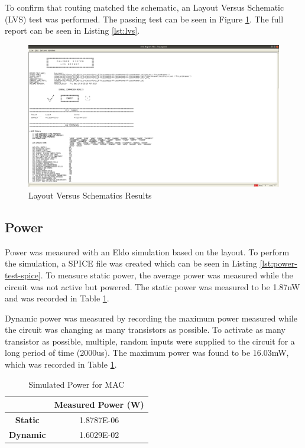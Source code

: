 \documentclass[11pt]{article}
\begin{document}
		To confirm that routing matched the schematic, an Layout Versus Schematic (LVS) test was performed. The passing test can be seen in Figure \ref{fig:LVS-Pass}. The full report can be seen in Listing \ref{lst:lvs}.
		
		\begin{figure}[H] 
			\centering 
			\includegraphics[width=\textwidth,height=\dimexpr\textheight-4\baselineskip-\abovecaptionskip-\belowcaptionskip\relax,keepaspectratio]{"Pictures/LVS Pass"}
			\caption{Layout Versus Schematics Results} 
			\label{fig:LVS-Pass} 
		\end{figure}
	
	\subsection{Power}
		Power was measured with an Eldo simulation based on the layout. To perform the simulation, a SPICE file was created which can be seen in Listing \ref{lst:power-test-spice}. To measure static power, the average power was measured while the circuit was not active but powered. The static power was measured to be 1.87nW and was recorded in Table \ref{tab:power}. 
		
		Dynamic power was measured by recording the maximum power measured while the circuit was changing as many transistors as possible. To activate as many transistor as possible, multiple, random inputs were supplied to the circuit for a long period of time (2000us). The maximum power was found to be 16.03mW, which was recorded in Table \ref{tab:power}.
		
		
		
		\begin{table}[H]
			\centering
			\caption{Simulated Power for MAC}
			\label{tab:power}
			\begin{tabular}{|cc|}
				\hline
				\textbf{}        & \textbf{Measured Power (W)} \\
				\hline
				\textbf{Static}  & 1.8787E-06           \\
				\textbf{Dynamic} & 1.6029E-02           \\ 
				\hline                     
			\end{tabular}
		\end{table}
	
\end{document}
